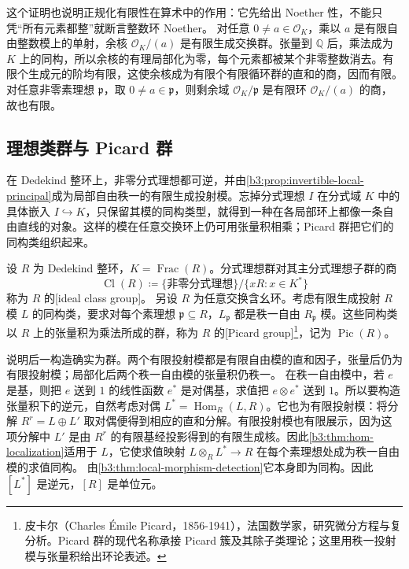 这个证明也说明正规化有限性在算术中的作用：它先给出 Noether 性，不能只凭“所有元素都整”就断言整数环 Noether。 对任意 \(0\ne a\in\mathcal O_K\)，乘以 \(a\) 是有限自由整数模上的单射，余核 \(\mathcal O_K/(a)\) 是有限生成交换群。张量到 \(\mathbb Q\) 后，乘法成为 \(K\) 上的同构，所以余核的有理局部化为零，每个元素都被某个非零整数消去。有限个生成元的阶均有限，这使余核成为有限个有限循环群的直和的商，因而有限。对任意非零素理想 \(\mathfrak p\)，取 \(0\ne a\in\mathfrak p\)，则剩余域 \(\mathcal O_K/\mathfrak p\) 是有限环 \(\mathcal O_K/(a)\) 的商，故也有限。

\subsection{理想类群与 Picard 群}
\label{b3:subsec:1004:02}

在 Dedekind 整环上，非零分式理想都可逆，并由\cref{b3:prop:invertible-local-principal}成为局部自由秩一的有限生成投射模。忘掉分式理想 \(I\) 在分式域 \(K\) 中的具体嵌入 \(I\hookrightarrow K\)，只保留其模的同构类型，就得到一种在各局部环上都像一条自由直线的对象。这样的模在任意交换环上仍可用张量积相乘；Picard 群把它们的同构类组织起来。

\begin{definition}\label{b3:def:ideal-class-picard}
	设 \(R\) 为 Dedekind 整环，\(K=\operatorname{Frac}(R)\)。分式理想群对其主分式理想子群的商
	\[
		\operatorname{Cl}(R)\coloneqq \{\text{非零分式理想}\}/\{xR:x\in K^*\}
	\]
	称为 \(R\) 的[ideal class group]。 另设 \(R\) 为任意交换含幺环。考虑有限生成投射 \(R\) 模 \(L\) 的同构类，要求对每个素理想 \(\mathfrak p\subseteq R\)，\(L_{\mathfrak p}\) 都是秩一自由 \(R_{\mathfrak p}\) 模。这些同构类以 \(R\) 上的张量积为乘法所成的群，称为 \(R\) 的[Picard group]\footnote{皮卡尔（Charles Émile Picard，1856-1941），法国数学家，研究微分方程与复分析。Picard 群的现代名称承接 Picard 簇及其除子类理论；这里用秩一投射模与张量积给出环论表述。}，记为 \(\operatorname{Pic}(R)\)。
\end{definition}

说明后一构造确实为群。两个有限投射模都是有限自由模的直和因子，张量后仍为有限投射模；局部化后两个秩一自由模的张量积仍秩一。 在秩一自由模中，若 \(e\) 是基，则把 \(e\) 送到 \(1\) 的线性函数 \(e^*\) 是对偶基，求值把 \(e\otimes e^*\) 送到 \(1\)。所以要构造张量积下的逆元，自然考虑对偶 \(L^*=\operatorname{Hom}_R(L,R)\)。它也为有限投射模：将分解 \(R^r=L\oplus L'\) 取对偶便得到相应的直和分解。有限投射模也有限展示，因为这项分解中 \(L'\) 是由 \(R^r\) 的有限基经投影得到的有限生成核。因此\cref{b3:thm:hom-localization}适用于 \(L\)，它使求值映射 \(L\otimes_RL^*\rightarrow R\) 在每个素理想处成为秩一自由模的求值同构。 由\cref{b3:thm:local-morphism-detection}它本身即为同构。因此 \([L^*]\) 是逆元，\([R]\) 是单位元。

